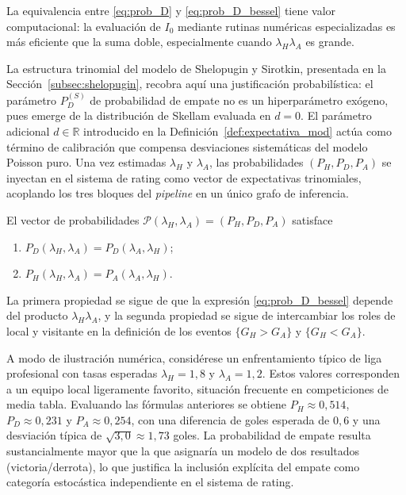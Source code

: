 La equivalencia entre \eqref{eq:prob_D} y \eqref{eq:prob_D_bessel} tiene valor computacional: la evaluaci\'on de $I_0$ mediante rutinas num\'ericas especializadas es m\'as eficiente que la suma doble, especialmente cuando $\lambda_H\lambda_A$ es grande.

La estructura trinomial del modelo de Shelopugin y Sirotkin, presentada en la Secci\'on~\ref{subsec:shelopugin}, recobra aqu\'i una justificaci\'on probabil\'istica: el par\'ametro $P_D^{(S)}$ de probabilidad de empate no es un hiperpar\'ametro ex\'ogeno, pues emerge de la distribuci\'on de Skellam evaluada en $d=0$. El par\'ametro adicional $d\in\mathbb{R}$ introducido en la Definici\'on~\ref{def:expectativa_mod} act\'ua como t\'ermino de calibraci\'on que compensa desviaciones sistem\'aticas del modelo Poisson puro. Una vez estimadas $\lambda_H$ y $\lambda_A$, las probabilidades $(P_H, P_D, P_A)$ se inyectan en el sistema de rating como vector de expectativas trinomiales, acoplando los tres bloques del \textit{pipeline} en un \'unico grafo de inferencia.

\begin{obs}
	\label{obs:simetria_trinomial}
	
	El vector de probabilidades $\mathcal{P}(\lambda_H,\lambda_A) = (P_H, P_D, P_A)$ satisface
	\begin{enumerate}
		\item $P_D(\lambda_H, \lambda_A) = P_D(\lambda_A, \lambda_H)$;
		\item $P_H(\lambda_H, \lambda_A) = P_A(\lambda_A, \lambda_H)$.
	\end{enumerate}
	La primera propiedad se sigue de que la expresi\'on \eqref{eq:prob_D_bessel} depende del producto $\lambda_H \lambda_A$, y la segunda propiedad se sigue de intercambiar los roles de local y visitante en la definici\'on de los eventos $\{G_H > G_A\}$ y $\{G_H < G_A\}$.
\end{obs}

A modo de ilustraci\'on num\'erica, consid\'erese un enfrentamiento t\'ipico de liga profesional con tasas esperadas $\lambda_H = 1{,}8$ y $\lambda_A = 1{,}2$. Estos valores corresponden a un equipo local ligeramente favorito, situaci\'on frecuente en competiciones de media tabla. Evaluando las f\'ormulas anteriores se obtiene $P_H \approx 0{,}514$, $P_D \approx 0{,}231$ y $P_A \approx 0{,}254$, con una diferencia de goles esperada de $0{,}6$ y una desviaci\'on t\'ipica de $\sqrt{3{,}0} \approx 1{,}73$ goles. La probabilidad de empate resulta sustancialmente mayor que la que asignar\'ia un modelo de dos resultados (victoria/derrota), lo que justifica la inclusi\'on expl\'icita del empate como categor\'ia estoc\'astica independiente en el sistema de rating.

